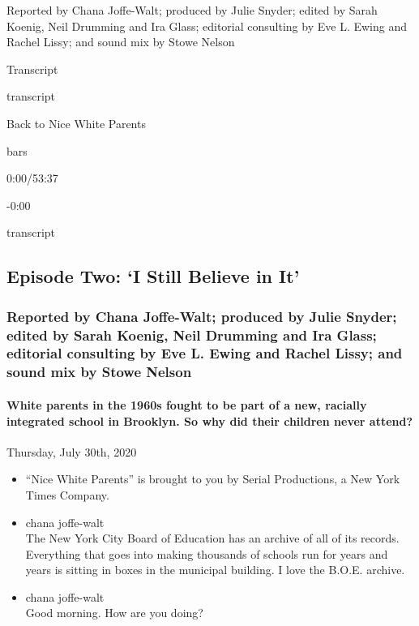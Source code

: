 Reported by Chana Joffe-Walt; produced by Julie Snyder; edited by Sarah
Koenig, Neil Drumming and Ira Glass; editorial consulting by Eve L.
Ewing and Rachel Lissy; and sound mix by Stowe Nelson

Transcript

transcript

Back to Nice White Parents

bars

0:00/53:37

-0:00

transcript

\hypertarget{episode-two-i-still-believe-in-it-2}{%
\subsection{Episode Two: `I Still Believe in
It'}\label{episode-two-i-still-believe-in-it-2}}

\hypertarget{reported-by-chana-joffe-walt-produced-by-julie-snyder-edited-by-sarah-koenig-neil-drumming-and-ira-glass-editorial-consulting-by-eve-l-ewing-and-rachel-lissy-and-sound-mix-by-stowe-nelson-1}{%
\subsubsection{Reported by Chana Joffe-Walt; produced by Julie Snyder;
edited by Sarah Koenig, Neil Drumming and Ira Glass; editorial
consulting by Eve L. Ewing and Rachel Lissy; and sound mix by Stowe
Nelson}\label{reported-by-chana-joffe-walt-produced-by-julie-snyder-edited-by-sarah-koenig-neil-drumming-and-ira-glass-editorial-consulting-by-eve-l-ewing-and-rachel-lissy-and-sound-mix-by-stowe-nelson-1}}

\hypertarget{white-parents-in-the-1960s-fought-to-be-part-of-a-new-racially-integrated-school-in-brooklyn-so-why-did-their-children-never-attend-2}{%
\paragraph{White parents in the 1960s fought to be part of a new,
racially integrated school in Brooklyn. So why did their children never
attend?}\label{white-parents-in-the-1960s-fought-to-be-part-of-a-new-racially-integrated-school-in-brooklyn-so-why-did-their-children-never-attend-2}}

Thursday, July 30th, 2020

\begin{itemize}
\item
  ``Nice White Parents'' is brought to you by Serial Productions, a New
  York Times Company.
\item
  chana joffe-walt\\
  The New York City Board of Education has an archive of all of its
  records. Everything that goes into making thousands of schools run for
  years and years is sitting in boxes in the municipal building. I love
  the B.O.E. archive.
\item
  chana joffe-walt\\
  Good morning. How are you doing?
\end{itemize}

